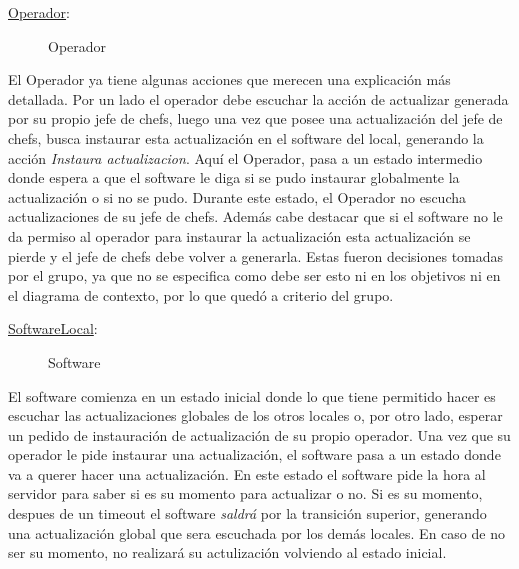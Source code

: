 \documentclass[a4paper,10pt]{article}
\begin{document}
\bigskip

\noindent \underline{Operador}: 

\begin{figure}[H]
\centering
{}
\caption{Operador}
\end{figure}

El Operador ya tiene algunas acciones que merecen una explicaci\'on m\'as detallada. Por un lado el operador debe escuchar la acci\'on de actualizar generada por su propio jefe de chefs, luego una vez que posee una actualizaci\'on del jefe de chefs, busca instaurar esta actualizaci\'on en el software del local, generando la acci\'on \emph{Instaura actualizacion}. Aqu\'i el Operador, pasa a un estado intermedio donde espera a que el software le diga si se pudo instaurar globalmente la actualizaci\'on o si no se pudo. Durante este estado, el Operador no escucha actualizaciones de su jefe de chefs. Adem\'as cabe destacar que si el software no le da permiso al operador para instaurar la actualizaci\'on esta actualizaci\'on se pierde y el jefe de chefs debe volver a generarla. Estas fueron decisiones tomadas por el grupo, ya que no se especifica como debe ser esto ni en los objetivos ni en el diagrama de contexto, por lo que qued\'o a criterio del grupo.

\bigskip

\noindent \underline{SoftwareLocal}:

\begin{figure}[H]
\centering
{}
\caption{Software}
\end{figure}


El software comienza en un estado inicial donde lo que tiene permitido hacer es escuchar las actualizaciones globales de los otros locales o, por otro lado, esperar un pedido de instauraci\'on de actualizaci\'on de su propio operador. Una vez que su operador le pide instaurar una actualizaci\'on, el software pasa a un estado donde va a querer hacer una actualizaci\'on. En este estado el software pide la hora al servidor para saber si es su momento para actualizar o no. Si es su momento, despues de un timeout el software \emph{saldr\'a} por la transici\'on superior, generando una actualizaci\'on global que sera escuchada por los dem\'as locales. En caso de no ser su momento, no realizar\'a su actulizaci\'on volviendo al estado inicial.
\end{document}

